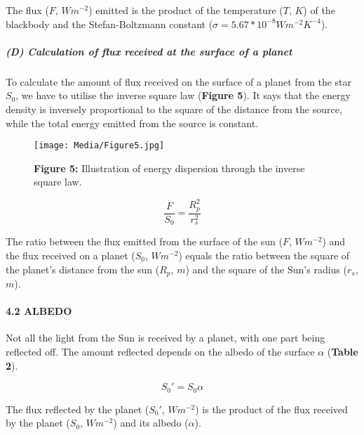 \documentclass[
  letterpaper,
  DIV=11,
  numbers=noendperiod]{scrartcl}
\let\oldparagraph\paragraph
\renewcommand{\paragraph}[1]{\oldparagraph{#1}\mbox{}}
\let\oldsubparagraph\subparagraph
\renewcommand{\subparagraph}[1]{\oldsubparagraph{#1}\mbox{}}
\begin{document}
The flux (\(F\), \(W m^{-2}\)) emitted is the product of the temperature
(\(T\), \(K\)) of the blackbody and the Stefan-Boltzmann constant
(\(\sigma = 5.67 * 10^{-8} W m^{-2} K^{-4}\)).

\hypertarget{d-calculation-of-flux-received-at-the-surface-of-a-planet}{%
\subparagraph{(D) Calculation of flux received at the surface of a
planet}\label{d-calculation-of-flux-received-at-the-surface-of-a-planet}}

To calculate the amount of flux received on the surface of a planet from
the star \(S_{0}\), we have to utilise the inverse square law
(\textbf{Figure 5}). It says that the energy density is inversely
proportional to the square of the distance from the source, while the
total energy emitted from the source is constant.

\begin{figure}

{\centering \texttt{[image: Media/Figure5.jpg]}

}

\caption{\textbf{Figure 5:} Illustration of energy dispersion through
the inverse square law.}

\end{figure}

\begin{equation}
\tag{3}
\frac{F}{S_{0}} = \frac{R_{p}^{2}}{r_{s}^{2}}
\end{equation}

The ratio between the flux emitted from the surface of the sun (\(F\),
\(W m^{-2}\)) and the flux received on a planet (\(S_{0}\),
\(W m^{-2}\)) equals the ratio between the square of the planet's
distance from the sun (\(R_{p}\), \(m\)) and the square of the Sun's
radius (\(r_{s}\), \(m\)).

\hypertarget{albedo}{%
\paragraph{4.2 ALBEDO}\label{albedo}}

Not all the light from the Sun is received by a planet, with one part
being reflected off. The amount reflected depends on the albedo of the
surface \(\alpha\) (\textbf{Table 2}).

\begin{equation}
\tag{4}
S_0' = S_0\alpha
\end{equation}

The flux reflected by the planet (\(S_0'\), \(W m^{-2}\)) is the product
of the flux received by the planet (\(S_0\), \(W m^{-2}\)) and its
albedo (\(\alpha\)).
\end{document}
